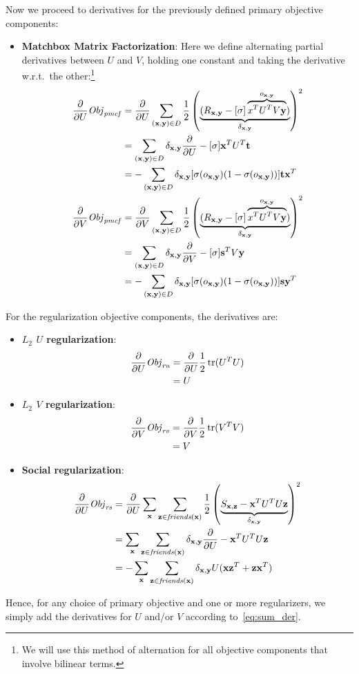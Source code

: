 Now we proceed to derivatives for the previously defined primary
objective components:
\begin{itemize}
\item {\bf Matchbox Matrix Factorization}:
Here we define alternating partial derivatives between $U$ and $V$, holding one
constant and taking the derivative w.r.t.\ the other:\footnote{We will use
this method of alternation for all objective components that involve bilinear
terms.}
\begin{align*}
\frac{\partial}{\partial U} \mathit{Obj}_{\mathit{pmcf}} & = \frac{\partial}{\partial U} \sum_{(\mathbf{x},\mathbf{y}) \in D} \frac{1}{2} \left( \underbrace{(R_{\mathbf{x},\mathbf{y}} - [\sigma] \overbrace{x^T U^T V\mathbf{y}}^{o_{\mathbf{x},\mathbf{y}}})}_{\delta_{\mathbf{x},\mathbf{y}}} \right)^2\\
& = \sum_{(\mathbf{x},\mathbf{y}) \in D} \delta_{\mathbf{x},\mathbf{y}} \frac{\partial}{\partial U} - [\sigma] \mathbf{x}^T U^T \mathbf{t} \\
& = - \sum_{(\mathbf{x},\mathbf{y}) \in D} \delta_{\mathbf{x},\mathbf{y}} [\sigma(o_{\mathbf{x},\mathbf{y}}) (1 - \sigma(o_{\mathbf{x},\mathbf{y}}))] \mathbf{t} \mathbf{x}^T \\
\frac{\partial}{\partial V} \mathit{Obj}_{\mathit{pmcf}} & = \frac{\partial}{\partial V} \sum_{(\mathbf{x},\mathbf{y}) \in D} \frac{1}{2} \left( \underbrace{(R_{\mathbf{x},\mathbf{y}} - [\sigma] \overbrace{x^T U^T V\mathbf{y}}^{o_{\mathbf{x},\mathbf{y}}})}_{\delta_{\mathbf{x},\mathbf{y}}} \right)^2\\
& = \sum_{(\mathbf{x},\mathbf{y}) \in D} \delta_{\mathbf{x},\mathbf{y}} \frac{\partial}{\partial V} - [\sigma] \mathbf{s}^T V \mathbf{y} \\
& = - \sum_{(\mathbf{x},\mathbf{y}) \in D} \delta_{\mathbf{x},\mathbf{y}} [\sigma(o_{\mathbf{x},\mathbf{y}}) (1 - \sigma(o_{\mathbf{x},\mathbf{y}}))] \mathbf{s} \mathbf{y}^T
\end{align*}
\end{itemize}

For the regularization objective components, the derivatives are:

\begin{itemize}
\item {\bf $L_2$ $U$ regularization}:
\begin{align*}
\frac{\partial}{\partial U} \mathit{Obj}_{\mathit{ru}} & = \frac{\partial}{\partial U} \frac{1}{2} \operatorname{tr}(U^T U) \\
& = U
\end{align*}
\item {\bf $L_2$ $V$ regularization}:
\begin{align*}
\frac{\partial}{\partial V} \mathit{Obj}_{\mathit{rv}} & = \frac{\partial}{\partial V} \frac{1}{2} \operatorname{tr}(V^T V) \\
& = V
\end{align*}
\item {\bf Social regularization}:
\begin{align*}
\frac{\partial}{\partial U} \mathit{Obj}_{\mathit{rs}} & = \frac{\partial}{\partial U} \sum_{\mathbf{x}} \sum_{\mathbf{z} \in \mathit{friends}(\mathbf{x})} \frac{1}{2} \left( \underbrace{S_{\mathbf{x},\mathbf{z}} - \mathbf{x}^T U^T U \mathbf{z}}_{\delta_{\mathbf{x},\mathbf{y}}} \right)^2 \\
& = \sum_{\mathbf{x}} \sum_{\mathbf{z} \in \mathit{friends}(\mathbf{x})} \delta_{\mathbf{x},\mathbf{y}} \frac{\partial}{\partial U} - \mathbf{x}^T U^T U \mathbf{z} \\
& = - \sum_{\mathbf{x}} \sum_{\mathbf{z} \in \mathit{friends}(\mathbf{x})} \delta_{\mathbf{x},\mathbf{y}} U (\mathbf{x} \mathbf{z}^T + \mathbf{z} \mathbf{x}^T)
\end{align*}

\end{itemize}

Hence, for any choice of primary objective and one or more regularizers,
we simply add the derivatives for $U$ and/or $V$ 
according to~\eqref{eq:sum_der}.

